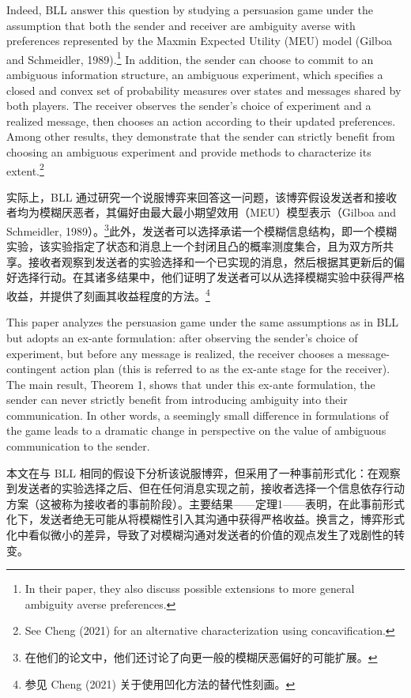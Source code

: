\documentclass[12pt,a4paper]{article}
\theoremstyle{definition}
\theoremstyle{remark}
\newenvironment{original}{%
    \par\medskip\noindent%
    \begin{tcolorbox}[%
        colback=white,%
        colframe=black!50,%
        title=\textbf{Original English},%
        fonttitle=\small\bfseries,%
        left=0pt, right=0pt, top=2pt, bottom=2pt,%
        boxrule=0.5pt,%
        arc=0pt,%
        outer arc=0pt%
    ]%
    \small%
}{%
    \end{tcolorbox}%
}
\newenvironment{translation}{%
    \par\smallskip\noindent%
    \begin{tcolorbox}[%
        colback=blue!3!white,%
        colframe=blue!40!black,%
        title=\textbf{中文翻译},%
        fonttitle=\small\bfseries,%
        left=0pt, right=0pt, top=2pt, bottom=2pt,%
        boxrule=0.5pt,%
        arc=0pt,%
        outer arc=0pt%
    ]%
    \small\color{blue!60!black}%
}{%
    \end{tcolorbox}\medskip%
}
\begin{document}
\begin{original}
Indeed, BLL answer this question by studying a persuasion game under the assumption that both the sender and receiver are ambiguity averse with preferences represented by the Maxmin Expected Utility (MEU) model (Gilboa and Schmeidler, 1989).\footnote{In their paper, they also discuss possible extensions to more general ambiguity averse preferences.} In addition, the sender can choose to commit to an ambiguous information structure, an ambiguous experiment, which specifies a closed and convex set of probability measures over states and messages shared by both players. The receiver observes the sender's choice of experiment and a realized message, then chooses an action according to their updated preferences. Among other results, they demonstrate that the sender can strictly benefit from choosing an ambiguous experiment and provide methods to characterize its extent.\footnote{See Cheng (2021) for an alternative characterization using concavification.}
\end{original}
\begin{translation}
实际上，BLL 通过研究一个说服博弈来回答这一问题，该博弈假设发送者和接收者均为模糊厌恶者，其偏好由最大最小期望效用（MEU）模型表示（Gilboa and Schmeidler, 1989）。\footnote{在他们的论文中，他们还讨论了向更一般的模糊厌恶偏好的可能扩展。}此外，发送者可以选择承诺一个模糊信息结构，即一个模糊实验，该实验指定了状态和消息上一个封闭且凸的概率测度集合，且为双方所共享。接收者观察到发送者的实验选择和一个已实现的消息，然后根据其更新后的偏好选择行动。在其诸多结果中，他们证明了发送者可以从选择模糊实验中获得严格收益，并提供了刻画其收益程度的方法。\footnote{参见 Cheng (2021) 关于使用凹化方法的替代性刻画。}
\end{translation}

\begin{original}
This paper analyzes the persuasion game under the same assumptions as in BLL but adopts an ex-ante formulation: after observing the sender's choice of experiment, but before any message is realized, the receiver chooses a message-contingent action plan (this is referred to as the ex-ante stage for the receiver). The main result, Theorem 1, shows that under this ex-ante formulation, the sender can never strictly benefit from introducing ambiguity into their communication. In other words, a seemingly small difference in formulations of the game leads to a dramatic change in perspective on the value of ambiguous communication to the sender.
\end{original}
\begin{translation}
本文在与 BLL 相同的假设下分析该说服博弈，但采用了一种事前形式化：在观察到发送者的实验选择之后、但在任何消息实现之前，接收者选择一个信息依存行动方案（这被称为接收者的事前阶段）。主要结果——定理1——表明，在此事前形式化下，发送者绝无可能从将模糊性引入其沟通中获得严格收益。换言之，博弈形式化中看似微小的差异，导致了对模糊沟通对发送者的价值的观点发生了戏剧性的转变。
\end{translation}
\end{document}
